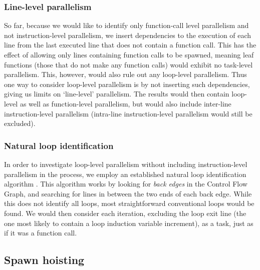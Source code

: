 \subsubsection{Line-level parallelism}
So far, because we would like to identify only function-call level parallelism and not instruction-level parallelism, we insert dependencies to the execution of each line from the last executed line that does not contain a function call.
This has the effect of allowing only lines containing function calls to be spawned, meaning leaf functions (those that do not make any function calls) would exhibit no task-level parallelism.
This, however, would also rule out any loop-level parallelism.
Thus one way to consider loop-level parallelism is by not inserting such dependencies, giving us limits on `line-level' parallelism.
The results would then contain loop-level as well as function-level parallelism, but would also include inter-line instruction-level parallelism (intra-line instruction-level parallelism would still be excluded).

\subsubsection{Natural loop identification}
In order to investigate loop-level parallelism without including instruction-level parallelism in the process, we employ an established natural loop identification algorithm \cite{aho86compilers, muchnick97advanced}.
This algorithm works by looking for \emph{back edges} in the Control Flow Graph, and searching for lines in between the two ends of each back edge.
While this does not identify all loops, most straightforward conventional loops would be found.
We would then consider each iteration, excluding the loop exit line (the one most likely to contain a loop induction variable increment), as a task, just as if it was a function call.

\subsection{Spawn hoisting}

